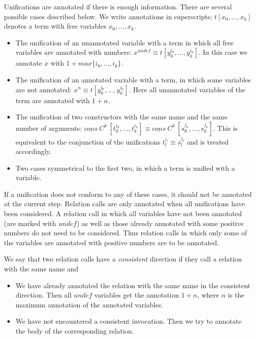 \documentclass[submission,copyright,creativecommons]{eptcs}
\begin{document}
Unifications are annotated if there is enough information.
There are several possible cases described below.
We write annotations in superscripts; $t[x_0, \dots, x_k]$ denotes a term with free variables $x_0, \dots, x_k$.
\begin{itemize}
  \item The unification of an unannotated variable with a term in which all free variables are annotated with numbers: $x^{undef} \equiv t[y_0^{i_0},\dots, y_k^{i_k}]$. In this case we annotate $x$ with $1+max\{i_0,\dots,i_k\}$.
  \item The unification of an annotated variable with a term, in which some variables are not annotated: $x^{n} \equiv t[y_0^{i_0},\dots, y_k^{i_k}]$. Here all unannotated variables of the term are annotated with $1+n$.
  \item The unification of two constructors with the same name and the same number of arguments: $\underline{cons} \ C^k \ [t_0^{i_0}, \dots, t_k^{i_k}] \equiv \underline{cons} \ C^k \ [s_0^{j_0}, \dots, s_k^{j_k}]$. This is equivalent to the conjunction of the unifications $t_l^{i_l} \equiv s_l^{j_l}$ and is treated accordingly.
  \item Two cases symmetrical to the first two, in which a term is unified with a variable.
\end{itemize}

If a unification does not conform to any of these cases, it should not be annotated at the current step.
Relation calls are only annotated when all unifications have been considered.
A relation call in which all variables have not been annotated (are marked with $undef$) as well as those already annotated with some positive numbers do not need to be considered.
Thus relation calls in which only some of the variables are annotated with positive numbers are to be annotated.

We say that two relation calls have a \emph{consistent} direction if they call a relation with the same name and

\begin{itemize}
  \item
   We have already annotated the relation with the same name in the consistent direction. Then all $undef$ variables get the annotation $1+n$, where $n$ is the maximum annotation of the annotated variables.
  \item We have not encountered a consistent invocation. Then we try to annotate the body of the corresponding relation.
\end{itemize}



\nocite{*}


\end{document}
